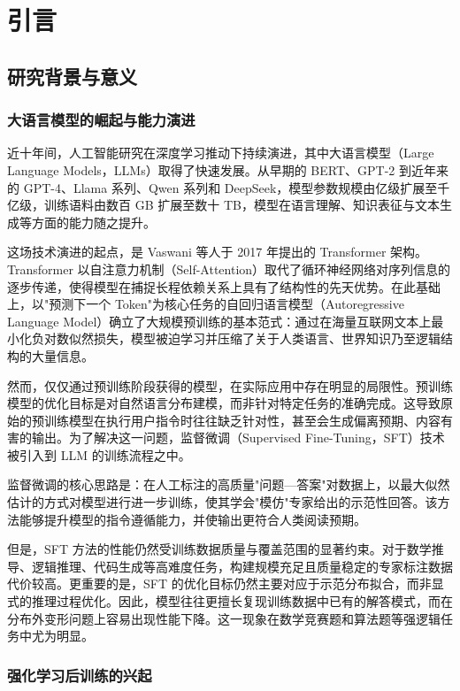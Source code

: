 \chapter{引言}

\section{研究背景与意义}

\subsection{大语言模型的崛起与能力演进}

近十年间，人工智能研究在深度学习推动下持续演进，其中大语言模型（Large Language Models，LLMs）取得了快速发展。从早期的 BERT、GPT-2 到近年来的 GPT-4、Llama 系列、Qwen 系列和 DeepSeek，模型参数规模由亿级扩展至千亿级，训练语料由数百 GB 扩展至数十 TB，模型在语言理解、知识表征与文本生成等方面的能力随之提升。

这场技术演进的起点，是 Vaswani 等人于 2017 年提出的 Transformer 架构。Transformer 以自注意力机制（Self-Attention）取代了循环神经网络对序列信息的逐步传递，使得模型在捕捉长程依赖关系上具有了结构性的先天优势。在此基础上，以"预测下一个 Token"为核心任务的自回归语言模型（Autoregressive Language Model）确立了大规模预训练的基本范式：通过在海量互联网文本上最小化负对数似然损失，模型被迫学习并压缩了关于人类语言、世界知识乃至逻辑结构的大量信息。

然而，仅仅通过预训练阶段获得的模型，在实际应用中存在明显的局限性。预训练模型的优化目标是对自然语言分布建模，而非针对特定任务的准确完成。这导致原始的预训练模型在执行用户指令时往往缺乏针对性，甚至会生成偏离预期、内容有害的输出。为了解决这一问题，监督微调（Supervised Fine-Tuning，SFT）技术被引入到 LLM 的训练流程之中。

监督微调的核心思路是：在人工标注的高质量"问题—答案"对数据上，以最大似然估计的方式对模型进行进一步训练，使其学会"模仿"专家给出的示范性回答。该方法能够提升模型的指令遵循能力，并使输出更符合人类阅读预期。

但是，SFT 方法的性能仍然受训练数据质量与覆盖范围的显著约束。对于数学推导、逻辑推理、代码生成等高难度任务，构建规模充足且质量稳定的专家标注数据代价较高。更重要的是，SFT 的优化目标仍然主要对应于示范分布拟合，而非显式的推理过程优化。因此，模型往往更擅长复现训练数据中已有的解答模式，而在分布外变形问题上容易出现性能下降。这一现象在数学竞赛题和算法题等强逻辑任务中尤为明显。

\subsection{强化学习后训练的兴起}

